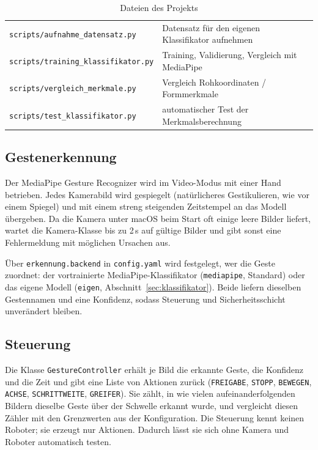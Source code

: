 \documentclass[11pt,a4paper]{article}
\newcommand{\datei}[1]{\texttt{#1}}
\begin{document}
\begin{table}[H]
\begin{tabularx}{\textwidth}{>{\raggedright\arraybackslash}p{6.1cm}>{\raggedright\arraybackslash}X}
\datei{scripts/aufnahme\_datensatz.py} & Datensatz für den eigenen Klassifikator aufnehmen \\
\datei{scripts/training\_klassifikator.py} & Training, Validierung, Vergleich mit MediaPipe \\
\datei{scripts/vergleich\_merkmale.py} & Vergleich Rohkoordinaten / Formmerkmale \\
\datei{scripts/test\_klassifikator.py} & automatischer Test der Merkmalsberechnung \\
\bottomrule
\end{tabularx}
\caption{Dateien des Projekts}
\end{table}

\subsection{Gestenerkennung}

Der MediaPipe Gesture Recognizer wird im Video-Modus mit einer Hand betrieben. Jedes Kamerabild
wird gespiegelt (natürlicheres Gestikulieren, wie vor einem Spiegel) und mit einem streng
steigenden Zeitstempel an das Modell übergeben. Da die Kamera unter macOS beim Start oft einige
leere Bilder liefert, wartet die Kamera-Klasse bis zu 2\,s auf gültige Bilder und gibt sonst eine
Fehlermeldung mit möglichen Ursachen aus.

Über \texttt{erkennung.backend} in \datei{config.yaml} wird festgelegt, wer die Geste zuordnet:
der vortrainierte MediaPipe-Klassifikator (\texttt{mediapipe}, Standard) oder das eigene Modell
(\texttt{eigen}, Abschnitt~\ref{sec:klassifikator}). Beide liefern dieselben Gestennamen und eine
Konfidenz, sodass Steuerung und Sicherheitsschicht unverändert bleiben.

\subsection{Steuerung}

Die Klasse \texttt{GestureController} erhält je Bild die erkannte Geste, die Konfidenz und die Zeit
und gibt eine Liste von Aktionen zurück (\texttt{FREIGABE}, \texttt{STOPP}, \texttt{BEWEGEN},
\texttt{ACHSE}, \texttt{SCHRITTWEITE}, \texttt{GREIFER}). Sie zählt, in wie vielen
aufeinanderfolgenden Bildern dieselbe Geste über der Schwelle erkannt wurde, und vergleicht diesen
Zähler mit den Grenzwerten aus der Konfiguration. Die Steuerung kennt keinen Roboter; sie erzeugt
nur Aktionen. Dadurch lässt sie sich ohne Kamera und Roboter automatisch testen.
\end{document}
